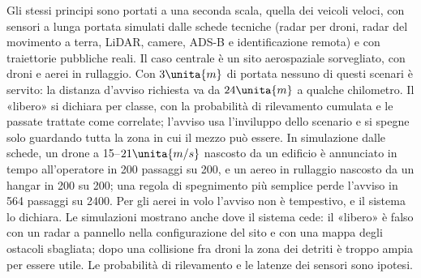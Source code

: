 Gli stessi principi sono portati a una seconda scala, quella dei veicoli veloci, con sensori a lunga portata simulati dalle schede tecniche (radar per droni, radar del movimento a terra, LiDAR, camere, ADS-B e identificazione remota) e con traiettorie pubbliche reali. Il caso centrale è un sito aerospaziale sorvegliato, con droni e aerei in rullaggio. Con $3\unita{m}$ di portata nessuno di questi scenari è servito: la distanza d'avviso richiesta va da $24\unita{m}$ a qualche chilometro. Il «libero» si dichiara per classe, con la probabilità di rilevamento cumulata e le passate trattate come correlate; l'avviso usa l'inviluppo dello scenario e si spegne solo guardando tutta la zona in cui il mezzo può essere. In simulazione dalle schede, un drone a 15--$21\unita{m/s}$ nascosto da un edificio è annunciato in tempo all'operatore in 200 passaggi su 200, e un aereo in rullaggio nascosto da un hangar in 200 su 200; una regola di spegnimento più semplice perde l'avviso in 564 passaggi su 2400. Per gli aerei in volo l'avviso non è tempestivo, e il sistema lo dichiara. %
Le simulazioni mostrano anche dove il sistema cede: il «libero» è falso con un radar a pannello nella configurazione del sito e con una mappa degli ostacoli sbagliata; dopo una collisione fra droni la zona dei detriti è troppo ampia per essere utile. Le probabilità di rilevamento e le latenze dei sensori sono ipotesi.
